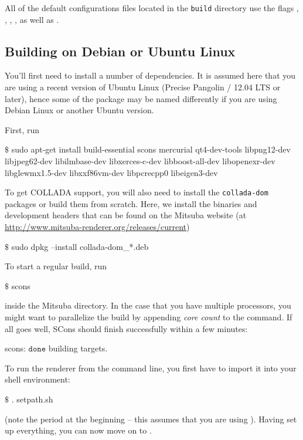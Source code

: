 All of the default configurations files located in the \texttt{build} directory use the flags 
, , , ,
as well as .

\subsection{Building on Debian or Ubuntu Linux}
\label{sec:compiling-ubuntu}
You'll first need to install a number of dependencies. It is assumed here that you are using a 
recent version of Ubuntu Linux (Precise Pangolin / 12.04 LTS or later), hence some of the 
package may be named differently if you are using Debian Linux or another Ubuntu version.

First, run
\begin{shell}
$\text{\$}$ sudo apt-get install build-essential scons mercurial qt4-dev-tools libpng12-dev 
    libjpeg62-dev libilmbase-dev libxerces-c-dev libboost-all-dev 
	libopenexr-dev libglewmx1.5-dev libxxf86vm-dev libpcrecpp0 libeigen3-dev
\end{shell}
To get COLLADA support, you will also need to install the \texttt{collada-dom} packages 
or build them from scratch. Here, we install the  binaries and development 
headers that can be found on the Mitsuba website (at \url{http://www.mitsuba-renderer.org/releases/current})
\begin{shell}
$\text{\$}$ sudo dpkg --install collada-dom_*.deb
\end{shell}
To start a regular build, run
\begin{shell}
$\text{\$}$ scons
\end{shell}
inside the Mitsuba directory. In the case that you have multiple processors, you might want to parallelize the 
build by appending \emph{core count} to the  command.
If all goes well, SCons should finish successfully within a few minutes:
\begin{shell}
scons: $\texttt{done}$ building targets.
\end{shell}
To run the renderer from the command line, you first have to import it into your shell environment:
\begin{shell}
$\text{\$}$ . setpath.sh
\end{shell}
(note the period at the beginning -- this assumes that you are using ).
Having set up everything, you can now move on to .
